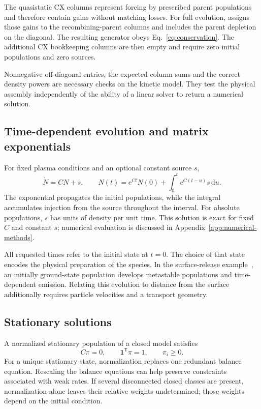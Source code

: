 \documentclass[11pt,a4paper]{article}
\newcommand{\vb}[1]{\boldsymbol{#1}}
\newcommand{\routine}[1]{\textsf{\detokenize{#1}}}
\newcommand{\dd}{\mathrm{d}}
\newcommand{\ee}{\mathrm{e}}
\numberwithin{equation}{section}
\begin{document}
The quasistatic CX columns represent forcing by prescribed parent
populations and therefore contain gains without matching losses.
For full evolution, \routine{solve_time_dependent} assigns those gains
to the recombining-parent columns and includes the parent depletion on
the diagonal. The resulting generator obeys Eq.~\eqref{eq:conservation}.
The additional CX bookkeeping columns are then empty and require zero
initial populations and zero sources.

Nonnegative off-diagonal entries, the expected column sums and the
correct density powers are necessary checks on the kinetic model.
They test the physical assembly independently of the ability of a
linear solver to return a numerical solution.

\subsection{Time-dependent evolution and matrix exponentials}\label{sec:time}

For fixed plasma conditions and an optional constant source $s$,
\begin{equation}\label{eq:ode}
 \dot N=CN+s,\qquad
 N(t)=\ee^{Ct}N(0)+\int_0^t\ee^{C(t-u)}s\,\dd u.
\end{equation}
The exponential propagates the initial populations, while the integral
accumulates injection from the source throughout the interval. For
absolute populations, $s$ has units of density per unit time. This
solution is exact for fixed $C$ and constant $s$; numerical evaluation
is discussed in Appendix~\ref{app:numerical-methods}.

All requested times refer to the initial state at $t=0$. The choice of
that state encodes the physical preparation of the species. In the
surface-release example~\cite{johnson}, an initially ground-state
population develops metastable populations and time-dependent emission.
Relating this evolution to distance from the surface additionally
requires particle velocities and a transport geometry.

\subsection{Stationary solutions}

A normalized stationary population of a closed model satisfies
\begin{equation}
 C\pi=0,\qquad \vb1^{\mathsf T}\pi=1,\qquad \pi_i\ge0.
\end{equation}
For a unique stationary state, normalization replaces one redundant
balance equation. Rescaling the balance equations can help preserve
constraints associated with weak rates. If several disconnected closed
classes are present, normalization alone leaves their relative weights
undetermined; those weights depend on the initial condition.
\end{document}
